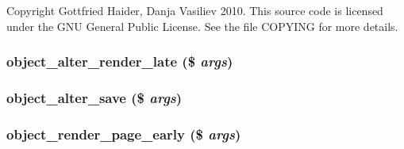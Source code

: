Copyright Gottfried Haider, Danja Vasiliev 2010. This source code is licensed under the GNU General Public License. See the file COPYING for more details. \hypertarget{module__object_8inc_8php_6b5bf16a15b7d5809bd7c6d15cd05a52}{
\subsubsection[{object\_\-alter\_\-render\_\-late}]{\setlength{\rightskip}{0pt plus 5cm}object\_\-alter\_\-render\_\-late (\$ {\em args})}}
\label{module__object_8inc_8php_6b5bf16a15b7d5809bd7c6d15cd05a52}


\hypertarget{module__object_8inc_8php_ba3a00b339dc7e9831b48a94f4f8e211}{
\subsubsection[{object\_\-alter\_\-save}]{\setlength{\rightskip}{0pt plus 5cm}object\_\-alter\_\-save (\$ {\em args})}}
\label{module__object_8inc_8php_ba3a00b339dc7e9831b48a94f4f8e211}


\hypertarget{module__object_8inc_8php_d06c13f1778d655f4a011d1763c6e618}{
\subsubsection[{object\_\-render\_\-page\_\-early}]{\setlength{\rightskip}{0pt plus 5cm}object\_\-render\_\-page\_\-early (\$ {\em args})}}
\label{module__object_8inc_8php_d06c13f1778d655f4a011d1763c6e618}


